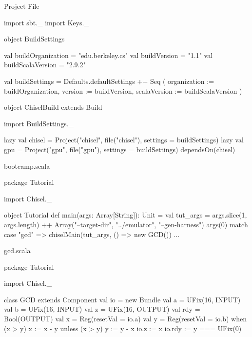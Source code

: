 \documentclass[xcolor=pdflatex,dvipsnames,table]{beamer}
\newenvironment{FramedVerb}%
{\VerbatimEnvironment
\begin{Sbox}\begin{minipage}{.94\textwidth}\begin{Verbatim}}%
{\end{Verbatim}\end{minipage}\end{Sbox}
\setlength{\fboxsep}{8pt}\fbox{\TheSbox}}
\begin{document}
\begin{frame}{Project File}
\begin{scala}
import sbt._
import Keys._

object BuildSettings {
  val buildOrganization = "edu.berkeley.cs"
  val buildVersion = "1.1"
  val buildScalaVersion = "2.9.2"

  val buildSettings = Defaults.defaultSettings ++ Seq (
    organization := buildOrganization,
    version      := buildVersion,
    scalaVersion := buildScalaVersion
  )
}

object ChiselBuild extends Build {
  import BuildSettings._

  lazy val chisel = 
    Project("chisel", file("chisel"), 
      settings = buildSettings)
  lazy val gpu =
    Project("gpu", file("gpu"), settings = buildSettings) 
      dependsOn(chisel)
}
\end{scala}
\end{frame}

\begin{frame}{bootcamp.scala}
\begin{scala}
package Tutorial {

import Chisel._

object Tutorial {
  def main(args: Array[String]): Unit = { 
    val tut_args = args.slice(1, args.length) ++ 
      Array("--target-dir", "../emulator", "--gen-harness")
    args(0) match {
      case "gcd" => 
        chiselMain(tut_args, () => new GCD())
      ...
    }
  }
}

}
\end{scala}
\end{frame}

\begin{frame}{gcd.scala}
\begin{scala}
package Tutorial {

import Chisel._

class GCD extends Component {
  val io = new Bundle {
    val a   = UFix(16, INPUT)
    val b   = UFix(16, INPUT)
    val z   = UFix(16, OUTPUT)
    val rdy = Bool(OUTPUT)
  }
  val x  = Reg(resetVal = io.a)
  val y  = Reg(resetVal = io.b)
  when   (x > y) { x := x - y } 
  unless (x > y) { y := y - x }
  io.z   := x
  io.rdy := y === UFix(0)
}

}
\end{scala}
\end{frame}
\end{document}
